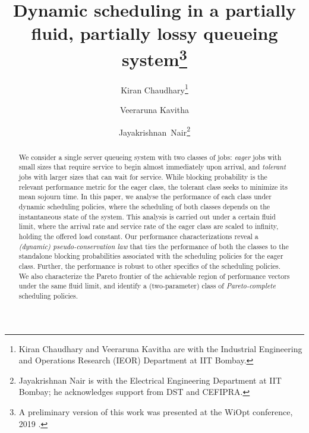 \documentclass{article}
\renewcommand{\vspace}[1]{} %
\begin{document}
\title{Dynamic scheduling in a partially fluid, partially lossy
  queueing system\thanks{A preliminary version of this work was
    presented at the WiOpt conference, 2019 \cite{Chaudhary2019}.}}

\author{Kiran Chaudhary\thanks{Kiran Chaudhary and Veeraruna Kavitha
    are with the Industrial Engineering and Operations Research (IEOR)
    Department at IIT Bombay.}  \and Veeraruna Kavitha\footnotemark[2]
  \and Jayakrishnan~Nair\thanks{Jayakrishnan Nair is with the
    Electrical Engineering Department at IIT Bombay; he acknowledges
    support from DST and CEFIPRA.}}%


\maketitle

\begin{abstract}

  We consider a single server queueing system with two classes of
  jobs: {\it eager} jobs with small sizes that require service to
  begin almost immediately upon arrival, and {\it tolerant} jobs with
  larger sizes that can wait for service. While blocking probability
  is the relevant performance metric for the eager class, the tolerant
  class seeks to minimize its mean sojourn time. In this paper, we
  analyse the performance of each class under dynamic scheduling
  policies, where the scheduling of both classes depends on the
  instantaneous state of the system. This analysis is carried out
  under a certain fluid limit, where the arrival rate and service rate
  of the eager class are scaled to infinity, holding the offered load
  constant. Our performance characterizations reveal a {\it (dynamic)
    pseudo-conservation law} that ties the performance of both the
  classes to the standalone blocking probabilities associated with the
  scheduling policies for the eager class.
  Further, the performance is robust to other specifics of the
  scheduling policies. We also characterize the Pareto frontier of the
  achievable region of performance vectors under the same fluid limit,
  and identify a (two-parameter) class of {\it Pareto-complete}
  scheduling policies.
\end{abstract}







%
%
\appendix




%

\end{document}
